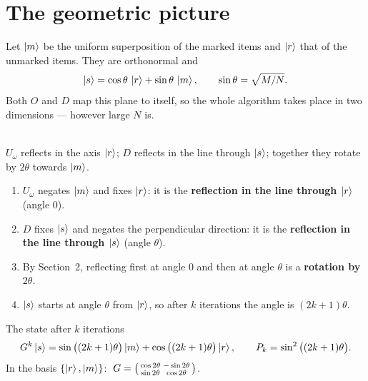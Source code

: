 \documentclass[11pt,a4paper,openany]{book}
\newenvironment{keepfig}{\par\noindent\begin{minipage}{\linewidth}\centering}{\end{minipage}\par\medskip}
\newenvironment{steps}{\begin{enumerate}[label=\textbf{Step \arabic*.}, leftmargin=4.2em, itemsep=2pt]}{\end{enumerate}}
\begin{document}
\section{The geometric picture}
Let $\ket{m}$ be the uniform superposition of the marked items and $\ket{r}$ that of the unmarked items. They are orthonormal and
\[ \ket{s} = \cos\theta\,\ket{r} + \sin\theta\,\ket{m}, \qquad \sin\theta = \sqrt{M/N}. \]
Both $O$ and $D$ map this plane to itself, so the whole algorithm takes place in two dimensions --- however large $N$ is.

\begin{keepfig}
\\
{\small $U_\omega$ reflects in the axis $\ket{r}$; $D$ reflects in the line through $\ket{s}$; together they rotate by $2\theta$ towards $\ket{m}$.}
\end{keepfig}

\begin{steps}
\item $U_\omega$ negates $\ket{m}$ and fixes $\ket{r}$: it is the \textbf{reflection in the line through $\ket{r}$} (angle $0$).
\item $D$ fixes $\ket{s}$ and negates the perpendicular direction: it is the \textbf{reflection in the line through $\ket{s}$} (angle $\theta$).
\item By Section~2, reflecting first at angle $0$ and then at angle $\theta$ is a \textbf{rotation by $2\theta$}.
\item $\ket{s}$ starts at angle $\theta$ from $\ket{r}$, so after $k$ iterations the angle is $(2k+1)\theta$.
\end{steps}
\begin{keyres}{The state after $k$ iterations}
\[ G^k\ket{s} = \sin\big((2k+1)\theta\big)\ket{m} + \cos\big((2k+1)\theta\big)\ket{r}, \qquad P_k = \sin^2\big((2k+1)\theta\big). \]
In the basis $\{\ket{r}, \ket{m}\}$: $\;G = \begin{psmallmatrix}\cos2\theta & -\sin2\theta\\ \sin2\theta & \cos2\theta\end{psmallmatrix}$.
\end{keyres}
\end{document}

